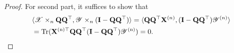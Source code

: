 \begin{lem}
\begin{proof}
For second part, it suffices to show that 
\begin{equation}
\begin{aligned}
&\langle \mathscr{X} \times_n \mathbf{Q}\mathbf{Q}^\top, \mathscr{Y}\times_n (\mathbf{I}-\mathbf{Q}\mathbf{Q}^\top)\rangle = \langle \mathbf{Q}\mathbf{Q}^\top\mathbf{X}^{(n)},  (\mathbf{I}-\mathbf{Q}\mathbf{Q}^\top)\mathscr{Y}^{(n)}\rangle\\
& = \rm{Tr}(\mathbf{X}^{(n)\top} \mathbf{Q}\mathbf{Q}^\top(\mathbf{I}-\mathbf{Q}\mathbf{Q}^\top)\mathscr{Y}^{(n)}) = 0.
\end{aligned}
\end{equation}
\end{proof}
\end{lem}